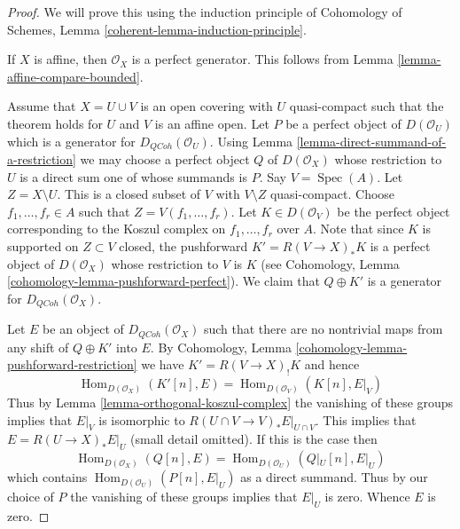 \documentclass{amsart}
\theoremstyle{plain}
\theoremstyle{definition}
\theoremstyle{remark}
\numberwithin{equation}{subsection}
\def\Spec{\mathop{\mathrm{Spec}}}
\def\Hom{\mathop{\mathrm{Hom}}\nolimits}
\def\QCoh{\mathit{QCoh}}
\begin{document}
\begin{proof}
We will prove this using the induction principle of
Cohomology of Schemes, Lemma \ref{coherent-lemma-induction-principle}.

\medskip\noindent
If $X$ is affine, then $\mathcal{O}_X$ is a perfect generator.
This follows from Lemma \ref{lemma-affine-compare-bounded}.

\medskip\noindent
Assume that $X = U \cup V$ is an open covering with $U$ quasi-compact
such that the theorem holds for $U$ and $V$ is an affine open.
Let $P$ be a perfect object of $D(\mathcal{O}_U)$ which is a generator
for $D_\QCoh(\mathcal{O}_U)$. Using
Lemma \ref{lemma-direct-summand-of-a-restriction} we may
choose a perfect object
$Q$ of $D(\mathcal{O}_X)$ whose restriction to $U$ is a direct sum one
of whose summands is $P$. Say $V = \Spec(A)$. Let $Z = X \setminus U$.
This is a closed subset of $V$ with $V \setminus Z$ quasi-compact.
Choose $f_1, \ldots, f_r \in A$ such that
$Z = V(f_1, \ldots, f_r)$. Let $K \in D(\mathcal{O}_V)$ be the perfect
object corresponding to the Koszul complex on $f_1, \ldots, f_r$ over $A$.
Note that since $K$ is supported on $Z \subset V$ closed, the pushforward
$K' = R(V \to X)_*K$ is a perfect object of $D(\mathcal{O}_X)$ whose
restriction to $V$ is $K$ (see
Cohomology, Lemma \ref{cohomology-lemma-pushforward-perfect}).
We claim that $Q \oplus K'$ is a generator for
$D_\QCoh(\mathcal{O}_X)$.

\medskip\noindent
Let $E$ be an object of $D_\QCoh(\mathcal{O}_X)$ such that
there are no nontrivial maps from any shift of $Q \oplus K'$ into $E$.
By Cohomology, Lemma \ref{cohomology-lemma-pushforward-restriction}
we have $K' =  R(V \to X)_! K$ and hence
$$
\Hom_{D(\mathcal{O}_X)}(K'[n], E) = \Hom_{D(\mathcal{O}_V)}(K[n], E|_V)
$$
Thus by Lemma \ref{lemma-orthogonal-koszul-complex} the vanishing of
these groups implies that $E|_V$ is isomorphic to
$R(U \cap V \to V)_*E|_{U \cap V}$. This implies that $E = R(U \to X)_*E|_U$
(small detail omitted). If this is the case then
$$
\Hom_{D(\mathcal{O}_X)}(Q[n], E) = \Hom_{D(\mathcal{O}_U)}(Q|_U[n], E|_U)
$$
which contains $\Hom_{D(\mathcal{O}_U)}(P[n], E|_U)$ as a direct summand.
Thus by our choice of $P$ the vanishing of these groups implies that $E|_U$
is zero. Whence $E$ is zero.
\end{proof}
\end{document}
